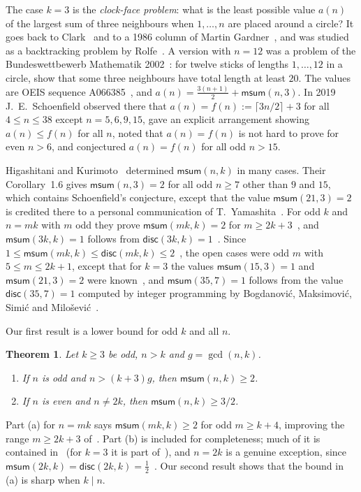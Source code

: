 \documentclass[11pt]{amsart}
\newtheorem{theorem}{Theorem}
\theoremstyle{remark}
\newcommand{\msum}{\mathsf{msum}}
\newcommand{\disc}{\mathsf{disc}}
\begin{document}
The case $k=3$ is the \emph{clock-face problem}: what is the least possible value $a(n)$ of the largest sum of
three neighbours when $1,\dots,n$ are placed around a circle? It goes back to Clark~\cite{Clark} and to a 1986
column of Martin Gardner~\cite{Gardner}, and was studied as a backtracking problem by Rolfe~\cite{Rolfe,RP}. A
version with $n=12$ was a problem of the Bundeswettbewerb Mathematik 2002~\cite{BWM}: for twelve sticks of lengths
$1,\dots,12$ in a circle, show that some three neighbours have total length at least $20$. The values are OEIS sequence A066385~\cite{OEIS}, and
$a(n)=\frac{3(n+1)}{2}+\msum(n,3)$. In 2019 J.~E.~Schoenfield observed there that $a(n)=f(n):=\lceil 3n/2\rceil+3$
for all $4\le n\le 38$ except $n=5,6,9,15$, gave an explicit arrangement showing $a(n)\le f(n)$ for all $n$,
noted that $a(n)=f(n)$ is not hard to prove for even $n>6$, and conjectured $a(n)=f(n)$ for all odd $n>15$.

Higashitani and Kurimoto~\cite{HK} determined $\msum(n,k)$ in many cases. Their Corollary~1.6 gives
$\msum(n,3)=2$ for all odd $n\ge7$ other than $9$ and $15$, which contains Schoenfield's conjecture, except that the value
$\msum(21,3)=2$ is credited there to a personal communication of T.~Yamashita~\cite[Remark~1.7]{HK}. For odd $k$
and $n=mk$ with $m$ odd they prove $\msum(mk,k)=2$ for $m\ge 2k+3$~\cite[Theorem~1.1]{HK}, and $\msum(3k,k)=1$
follows from $\disc(3k,k)=1$~\cite{AFG}. Since $1\le\msum(mk,k)\le\disc(mk,k)\le 2$~\cite{AFG}, the open cases were
odd $m$ with $5\le m\le 2k+1$, except that for $k=3$ the values $\msum(15,3)=1$ and $\msum(21,3)=2$ were
known~\cite[Remark~1.7]{HK}, and $\msum(35,7)=1$ follows from the value $\disc(35,7)=1$ computed by integer
programming by Bogdanovi\'c, Maksimovi\'c, Simi\'c and Milo\v{s}evi\'c~\cite{BMSM}.

Our first result is a lower bound for odd $k$ and all $n$.

\begin{theorem}\label{thm:lower}
Let $k\ge3$ be odd, $n>k$ and $g=\gcd(n,k)$.
\begin{enumerate}
\item[(a)] If $n$ is odd and $n>(k+3)g$, then $\msum(n,k)\ge 2$.
\item[(b)] If $n$ is even and $n\ne 2k$, then $\msum(n,k)\ge 3/2$.
\end{enumerate}
\end{theorem}

Part (a) for $n=mk$ says $\msum(mk,k)\ge2$ for odd $m\ge k+4$, improving the range $m\ge 2k+3$
of~\cite[Lemma~5.3]{HK}. Part (b) is included for completeness; much of it is contained in~\cite{HK} (for $k=3$
it is part of~\cite[Corollary~1.6(a)]{HK}), and $n=2k$ is a genuine exception, since
$\msum(2k,k)=\disc(2k,k)=\frac12$~\cite{AFG}. Our second result shows that the bound in (a) is sharp when
$k\mid n$.
\end{document}
